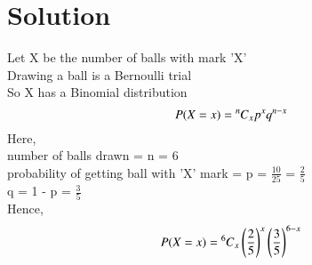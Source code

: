 \documentclass[journal,12pt,twocolumn]{IEEEtran}
\begin{document}
\section{Solution}
Let X be the number of balls with mark 'X' \\
Drawing a ball is a Bernoulli trial\\ 
So X has a Binomial distribution
\begin{equation}\label{eq:1}
    P(X=x) = \Mycomb[n]{x} p^x q^{n-x}
\end{equation}
Here, \\
number of balls drawn = n = 6\\
probability of getting ball with 'X' mark = p = $\frac{10}{25}$ = $\frac{2}{5}$\\
q = 1 - p = $\frac{3}{5}$\\
Hence, 
\begin{equation}\label{eq:2}
    P(X=x) = \Mycomb[6]{x} \left(\frac{2}{5}\right)^x \left(\frac{3}{5}\right)^{6-x}
\end{equation}
\end{document}

